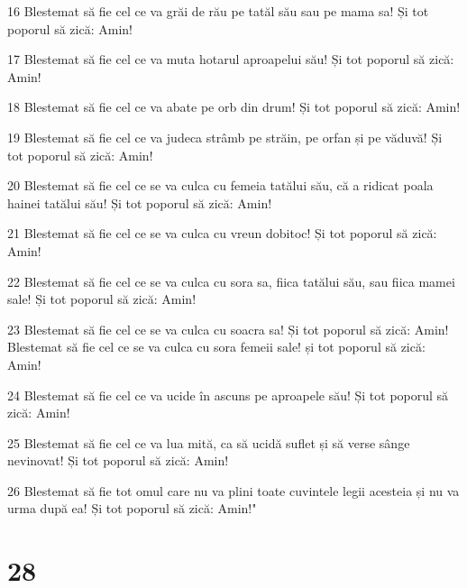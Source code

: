 \par 16 Blestemat să fie cel ce va grăi de rău pe tatăl său sau pe mama sa! Și tot poporul să zică: Amin!
\par 17 Blestemat să fie cel ce va muta hotarul aproapelui său! Și tot poporul să zică: Amin!
\par 18 Blestemat să fie cel ce va abate pe orb din drum! Și tot poporul să zică: Amin!
\par 19 Blestemat să fie cel ce va judeca strâmb pe străin, pe orfan și pe văduvă! Și tot poporul să zică: Amin!
\par 20 Blestemat să fie cel ce se va culca cu femeia tatălui său, că a ridicat poala hainei tatălui său! Și tot poporul să zică: Amin!
\par 21 Blestemat să fie cel ce se va culca cu vreun dobitoc! Și tot poporul să zică: Amin!
\par 22 Blestemat să fie cel ce se va culca cu sora sa, fiica tatălui său, sau fiica mamei sale! Și tot poporul să zică: Amin!
\par 23 Blestemat să fie cel ce se va culca cu soacra sa! Și tot poporul să zică: Amin! Blestemat să fie cel ce se va culca cu sora femeii sale! și tot poporul să zică: Amin!
\par 24 Blestemat să fie cel ce va ucide în ascuns pe aproapele său! Și tot poporul să zică: Amin!
\par 25 Blestemat să fie cel ce va lua mită, ca să ucidă suflet și să verse sânge nevinovat! Și tot poporul să zică: Amin!
\par 26 Blestemat să fie tot omul care nu va plini toate cuvintele legii acesteia și nu va urma după ea! Și tot poporul să zică: Amin!"

\chapter{28}

